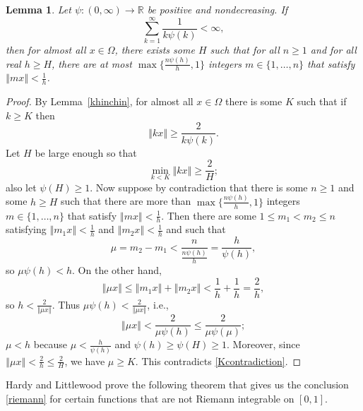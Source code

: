 \documentclass{amsart}
\newcommand{\norm}[1]{\left\Vert #1 \right\Vert}
\newtheorem{lemma}[theorem]{Lemma}
\begin{document}
\begin{lemma}
Let $\psi:(0,\infty) \to \mathbb{R}$ be positive and nondecreasing.
If 
\[
\sum_{k=1}^\infty \frac{1}{k\psi(k)}<\infty,
\]
then
for almost all $x \in \Omega$, there exists some $H$ such that for all $n \geq 1$ and for all real $h \geq H$, there are at most $\max\{\frac{n\psi(h)}{h},1\}$ integers $m \in \{1,\ldots,n\}$
that satisfy $\norm{mx} < \frac{1}{h}$.
\label{hllemma}
\end{lemma}
\begin{proof}
By Lemma~\ref{khinchin},
for almost all $x \in \Omega$ there is some $K$ such that if $k \geq K$ then
\begin{equation}
\norm{kx} \geq \frac{2}{k\psi(k)}.
\label{Kcontradiction}
\end{equation}
Let $H$ be  large enough  so that
\[
\min_{k < K} \norm{kx} \geq \frac{2}{H};
\]
also let $\psi(H) \geq 1$.
Now suppose by contradiction that there is some $n \geq 1$ and some $h \geq H$ such that there are more
than $\max\{\frac{n\psi(h)}{h},1\}$ integers $m \in \{1,\ldots,n\}$
that satisfy $\norm{mx} < \frac{1}{h}$.
Then there are some $1 \leq m_1 < m_2 \leq n$ satisfying $\norm{m_1 x}<\frac{1}{h}$ and $\norm{m_2 x}<
\frac{1}{h}$ and such that
\[
\mu=m_2-m_1< \frac{n}{\frac{n\psi(h)}{h}}=\frac{h}{\psi(h)},
\]
so $\mu \psi(h)<h$. 
On the other hand,
\[
\norm{\mu x} \leq \norm{m_1 x}+\norm{m_2 x}<\frac{1}{h}+\frac{1}{h}=\frac{2}{h},
\]
so $h<\frac{2}{\norm{\mu x}}$. Thus $\mu \psi(h)<\frac{2}{\norm{\mu x}}$, i.e.,
\[
\norm{\mu x}< \frac{2}{\mu \psi(h)} \leq \frac{2}{\mu \psi(\mu)};
\]
$\mu < h$ because $\mu<\frac{h}{\psi(h)}$ and $\psi(h) \geq \psi(H) \geq 1$.
Moreover, since $\norm{\mu x}<\frac{2}{h} \leq  \frac{2}{H}$, we have $\mu \geq K$. This contradicts \eqref{Kcontradiction}.
\end{proof}


Hardy and Littlewood \cite[p.~89, Theorem~4]{XXIV} prove the following theorem
that  gives us the conclusion \eqref{riemann} for certain functions that are not Riemann integrable on $[0,1]$.
\end{document}
